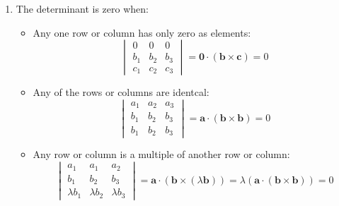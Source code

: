 \documentclass{article}
\renewcommand{\vec}[1]{\bm{#1}}
\newcommand{\vv}[1]{\vec{#1}}
\begin{document}
\begin{enumerate}
   \item The determinant is zero when:
      \begin{itemize}
         \item Any one row or column has only zero as elements:
            \[
            \begin{vmatrix}
               0 & 0 & 0\\
               b_1 & b_2 & b_3\\
               c_1 & c_2 & c_3
            \end{vmatrix}
            =\vv 0\cdot(\vv b\times\vv c)=0\]
         \item Any of the rows or columns are identcal:
            \[
            \begin{vmatrix}
               a_1 & a_2 & a_3\\
               b_1 & b_2 & b_3\\
               b_1 & b_2 & b_3
            \end{vmatrix}
            =\vv a\cdot(\vv b\times\vv b)=0\]
         \item Any row or column is a multiple of another row or column:
            \[
            \begin{vmatrix}
               a_1 & a_1 & a_2\\
               b_1 & b_2 & b_3\\
               \lambda b_1 & \lambda b_2 & \lambda b_3
            \end{vmatrix}
            =\vv a\cdot(\vv b\times(\lambda\vv b))=\lambda(\vv a\cdot(\vv b\times\vv b))=0\]
      \end{itemize}


\end{enumerate}
\end{document}
